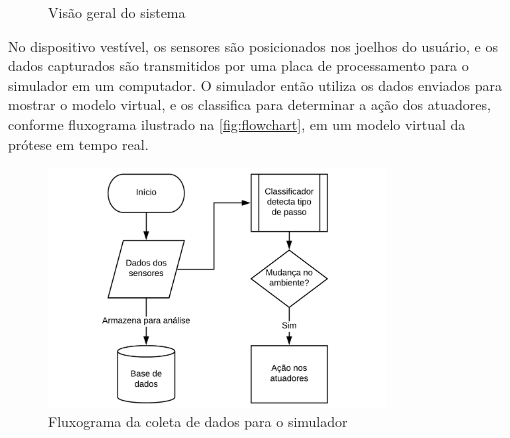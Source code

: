 \begin{figure}[ht]
    \centering
    \caption{Visão geral do sistema}%
    \label{fig:big_picture}
    \hspace{1cm}
\end{figure}

No dispositivo vestível, os sensores são posicionados nos joelhos do usuário, e os dados capturados são transmitidos por uma placa de processamento para o simulador em um computador. 
O simulador então utiliza os dados enviados para mostrar o modelo virtual, e os classifica para determinar a ação dos atuadores, conforme fluxograma ilustrado na \autoref{fig:flowchart}, em um modelo virtual da prótese em tempo real.

\begin{figure}[ht]
	\caption{\label{fig:flowchart}Fluxograma da coleta de dados para o simulador}
	\begin{center}
	    \includegraphics[width=0.8\textwidth]{resources/flowchart}
	\end{center}
\end{figure}


